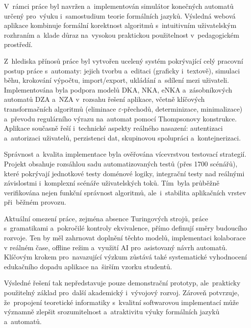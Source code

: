 \documentclass[
  master,
  program=ainfvs,
  printversion,
  figures=false,
  tables=false,
  glossaries,
  index
]{kidiplom}
\begin{document}
\begin{kiconclusions}
V~rámci práce byl navržen a~implementován simulátor konečných automatů určený pro~výuku i~samostudium teorie formálních jazyků. Výsledná webová aplikace kombinuje formální korektnost algoritmů s~intuitivním uživatelským rozhraním a~klade důraz na~vysokou praktickou použitelnost v~pedagogickém prostředí.

Z~hlediska přínosů práce byl vytvořen ucelený systém pokrývající celý pracovní postup práce s~automaty: jejich tvorbu a~editaci (graficky i~textově), simulaci běhu, krokování výpočtu, import/export, ukládání a~sdílení mezi uživateli. Implementována byla podpora modelů \gls{DKA}, \gls{NKA}, \gls{eNKA} a~zásobníkových automatů \gls{DZA} a~\gls{NZA} v~rozsahu řešení aplikace, včetně klíčových transformačních algoritmů (eliminace $\varepsilon$-přechodů, determinizace, minimalizace) a~převodu regulárního výrazu na~automat pomocí Thompsonovy konstrukce. Aplikace současně řeší i~technické aspekty reálného nasazení: autentizaci a~autorizaci uživatelů, perzistenci dat, skupinovou spolupráci a~kontejnerizaci.

Správnost a~kvalita implementace byla ověřována vícevrstvou testovací strategií. Projekt obsahuje rozsáhlou sadu automatizovaných testů (přes 1700 scénářů), které pokrývají jednotkové testy doménové logiky, integrační testy nad reálnými závislostmi i~komplexní scénáře uživatelských toků. Tím~byla průběžně verifikována nejen funkční správnost algoritmů, ale~i~stabilita aplikačních vrstev při~běžném provozu.

Aktuální omezení práce, zejména absence Turingových strojů, práce s~gramatikami a~pokročilé kontroly ekvivalence, přímo definují směry budoucího rozvoje. Ten by měl zahrnovat doplnění těchto modelů, implementaci kolaborace v reálném čase, offline režim a~využití AI pro~asistovaný návrh automatů. Klíčovým krokem pro~navazující výzkum zůstává také systematické vyhodnocení edukačního dopadu aplikace na~širším vzorku studentů.

Výsledné řešení tak nepředstavuje pouze demonstrační prototyp, ale~prakticky použitelný základ pro~další akademický i~vývojový rozvoj. Zároveň potvrzuje, že~propojení teoretické informatiky s~kvalitní softwarovou implementací může významně zlepšit srozumitelnost a~atraktivitu výuky formálních jazyků a~automatů.

\end{kiconclusions}
\end{document}

